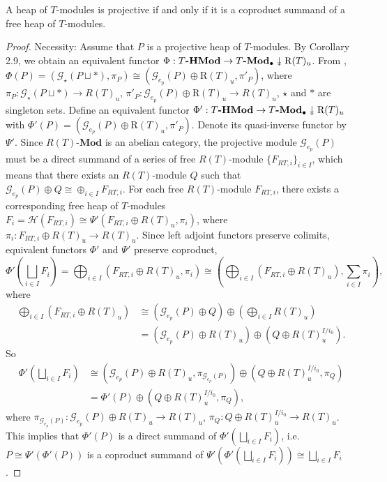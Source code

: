 \documentclass[11pt, twoside]{article}
\newcommand{\twoheaddownarrow}{\mathrel{\rotatebox[origin=c]{-90}{$\twoheadrightarrow$}}}
\begin{document}
\begin{theorem}\label{th2}
A heap of $T$-modules is projective if and only if it is a coproduct summand of a free heap of $T$-modules.
\end{theorem}
\begin{proof}
{Necessity: Assume that $P$ is a projective heap of $T$-modules. By Corollary 2.9, we obtain an equivalent functor $\Phi : T\textbf{-HMod} \rightarrow T \textbf{-Mod}_{\bullet}\twoheaddownarrow \mathrm{R}(T)_{u}$. From \cite[Theorem 4.14]{mb}, $\Phi(P) = (\mathcal{G}_{\star}(P \sqcup \ast),\pi_P) \cong (\mathcal{G}_{e_p}(P) \oplus \mathrm{R}(T)_{u},\pi'_P)$, where $\pi_P:\mathcal{G}_{\star}(P \sqcup \ast)\rightarrow R(T)_u$, $\pi'_P:\mathcal{G}_{e_p}(P) \oplus \mathrm{R}(T)_{u}\rightarrow R(T)_u$, $\star$ and $\ast $ are singleton sets. Define an equivalent functor $\Phi' : T\textbf{-HMod} \rightarrow T \textbf{-Mod}_{\bullet}\twoheaddownarrow \mathrm{R}(T)_{u}$ with $\Phi'(P) = (\mathcal{G}_{e_p}(P) \oplus \mathrm{R}(T)_{u},\pi'_P)$. Denote its quasi-inverse functor by $\Psi'$. Since $R(T)\textbf{-Mod}$ is an abelian category, the projective module $\mathcal{G}_{e_p}(P)$ must be a direct summand of a series of free $R(T)$-module $\{F_{RT,i}\}_{i \in I}$, which means that there exists an $R(T)$-module $Q$ such that $ \mathcal{G}_{e_p}(P) \oplus Q \cong \oplus_{i\in I}F_{RT,i}$. For each free $R(T)$-module $F_{RT,i}$, there exists a corresponding free heap of $T$-modules $F_i = \mathcal{H}(F_{RT,i}) \cong \Psi'(F_{RT,i} \oplus R(T)_u, \pi_{i})$, where $\pi_{i}: F_{RT,i} \oplus R(T)_u\rightarrow R(T)_u$. Since left adjoint functors preserve colimits, equivalent functors $\Phi'$ and $\Psi'$ preserve coproduct,
$$\Phi'(\bigsqcup_{i \in I}F_i) = \bigoplus_{i \in I}(F_{RT,i} \oplus R(T)_u, \pi_{i})
 \cong (\bigoplus_{i \in I}(F_{RT,i} \oplus R(T)_u), \sum_{i \in I}\pi_{i}),$$
where
\begin{align*}
\bigoplus_{i \in I}(F_{RT,i} \oplus R(T)_u) &\cong (\mathcal{G}_{e_p}(P) \oplus Q) \oplus (\bigoplus_{i \in I}R(T)_u)\\
 &= (\mathcal{G}_{e_p}(P) \oplus R(T)_u) \oplus (Q \oplus R(T)_u^{I/i_0}).
\end{align*}
So
\begin{align*}\Phi'(\bigsqcup_{i \in I}F_i) &\cong (\mathcal{G}_{e_p}(P) \oplus R(T)_u, \pi_{\mathcal{G}_{e_p}(P)}) \oplus (Q \oplus R(T)_u^{I/i_0}, \pi_Q)\\
 &= \Phi'(P) \oplus (Q \oplus R(T)_u^{I/i_0}, \pi_Q),\end{align*}
where $\pi_{\mathcal{G}_{e_p}(P)}: \mathcal{G}_{e_p}(P) \oplus R(T)_u\rightarrow R(T)_u$, $\pi_Q: Q \oplus R(T)_u^{I/i_0}\rightarrow R(T)_u$. This implies that $\Phi'(P)$ is a direct summand of $\Phi'(\bigsqcup_{i \in I}F_i)$, i.e. $P \cong \Psi'(\Phi'(P))$ is a coproduct summand of $ \Psi'(\Phi'(\bigsqcup_{i \in I}F_i)) \cong \bigsqcup_{i \in I}F_i$.

}
\end{proof}
\end{document}
